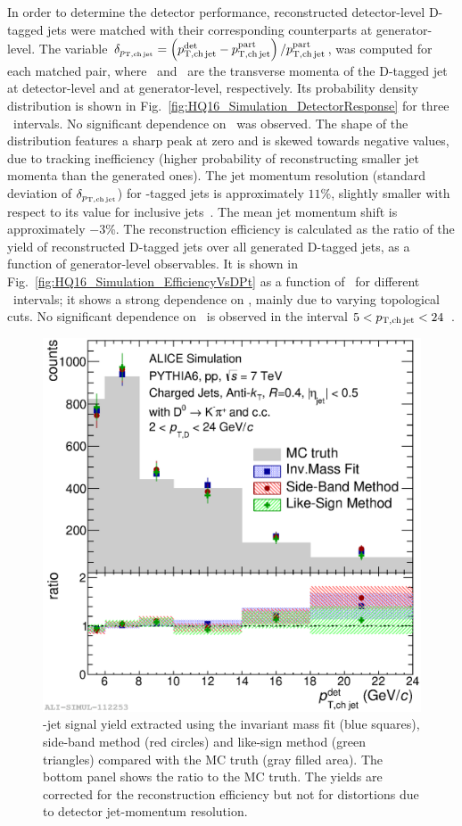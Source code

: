 \documentclass[a4paper]{jpconf}
\begin{document}
In order to determine the detector performance, reconstructed detector-level D-tagged jets were matched with their corresponding counterparts at generator-level.
The variable
\mbox{$\delta_{p_{\mathrm{T,ch\, jet}}}=\left( p_{\mathrm{T,ch\,jet}}^{\mathrm{det}} - p_{\mathrm{T,ch\,jet}}^{\mathrm{part}} \right) / p_{\mathrm{T,ch\,jet}}^{\mathrm{part}}$},
was computed for each matched pair,
where \ptchjetdet\ and \ptchjetgen\ are the transverse momenta of the D-tagged jet at detector-level and at generator-level, respectively.
Its probability density distribution is shown in Fig.~\ref{fig:HQ16_Simulation_DetectorResponse} for three \ptchjetgen\ intervals. No significant dependence on \ptchjetgen\ was observed.
The shape of the distribution features a sharp peak at zero and is skewed towards negative values, due to tracking inefficiency (higher probability of
reconstructing smaller jet momenta than the generated ones). The jet momentum resolution (standard deviation of $\delta_{p_{\mathrm{T,ch\, jet}}}$) for \Dzero-tagged jets is approximately \mbox{$11$\%}, 
slightly smaller with respect to its value for inclusive jets~\cite{ALICE:2015e}. The mean jet momentum shift is approximately \mbox{$-3$\%}.
The reconstruction efficiency is calculated as the ratio of the yield of reconstructed D-tagged jets over all generated D-tagged jets, as a function of generator-level observables.
It is shown in Fig.~\ref{fig:HQ16_Simulation_EfficiencyVsDPt} as a function of \ptd\ for different \ptchjet\ intervals; it shows a strong dependence on \ptd, mainly due to
varying topological cuts. No significant dependence on \ptchjet\ is observed in the interval $5<p_{\mathrm{T,ch\, jet}}<24$~\GeVc.
\begin{figure}[tb]
\includegraphics[width=.50\textwidth]{img/HQ16_Simulation_MethodComparison}\hspace{1pc}%
\begin{minipage}[b]{.50\textwidth}\caption{\label{fig:HQ16_Simulation_MethodComparison}\Dzero-jet signal yield extracted using the invariant mass fit (blue squares), side-band method (red circles) and like-sign method (green triangles)
compared with the MC truth (gray filled area). The bottom panel shows the ratio to the MC truth. The yields are corrected for the reconstruction efficiency but not for distortions due to detector jet-momentum resolution.}
\end{minipage}
\end{figure}
\end{document}
